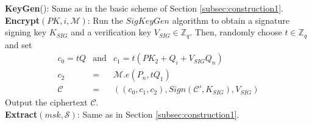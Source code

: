  \noindent \textbf{KeyGen}(): Same as in the basic scheme of Section \ref{subsec:construction1}.\\
 
 \noindent \textbf{Encrypt}$(PK,i,\mathcal{M})$: Run the $SigKeyGen$ algorithm to obtain a signature signing key $K_{SIG}$ and a verification key $V_{SIG} \in \mathbb{Z}_q$. Then, randomly choose $t\in\mathbb{Z}_q$ and set 
 \begin{eqnarray}
 c_0=tQ&\text{and}& c_1 = t{(PK_2+Q_i+V_{SIG}Q_n)}\nonumber\\
 c_2 &=& \mathcal{M}.{e}(P_n,tQ_1)\nonumber\\
 \mathcal{C}&=&((c_0,c_1,c_2),Sign(\mathcal{C}',K_{SIG}),V_{SIG}) \nonumber
 \end{eqnarray}
 \noindent Output the ciphertext $\mathcal{C}$.\\
 
 \noindent \textbf{Extract}$(msk,\mathcal{S})$: Same as in Section \ref{subsec:construction1}.\\
 
